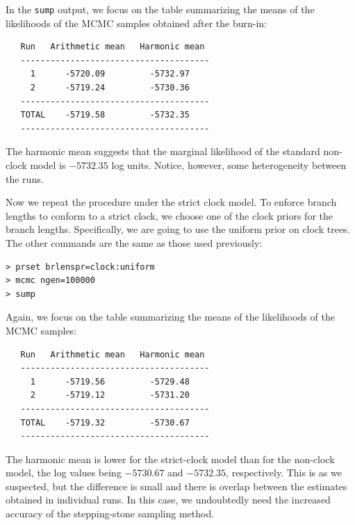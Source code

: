 \documentclass[12pt]{book}
\newcommand{\ttt}[1]{\texttt{#1}}
\begin{document}
In the \ttt{sump} output, we focus on the table summarizing the means of the likelihoods of the
MCMC samples obtained after the burn-in:

\begin{singlespacing}
\footnotesize
\begin{verbatim}
   Run   Arithmetic mean   Harmonic mean
   --------------------------------------
     1      -5720.09         -5732.97
     2      -5719.24         -5730.36
   --------------------------------------
   TOTAL    -5719.58         -5732.35
   --------------------------------------
\end{verbatim}
\end{singlespacing}
\normalsize

The harmonic mean suggests that the marginal likelihood of the standard non-clock model is
$-5732.35$ log units. Notice, however, some heterogeneity between the runs.

Now we repeat the procedure under the strict clock model. To enforce branch lengths to conform to a
strict clock, we choose one of the clock priors for the branch lengths. Specifically, we are going
to use the uniform prior on clock trees. The other commands are the same as those used previously:

\begin{singlespacing}
\small
\begin{verbatim}
> prset brlenspr=clock:uniform
> mcmc ngen=100000
> sump
\end{verbatim}
\end{singlespacing}
\normalsize

Again, we focus on the table summarizing the means of the likelihoods of the MCMC samples:

\begin{singlespacing}
\footnotesize
\begin{verbatim}
   Run   Arithmetic mean   Harmonic mean
   --------------------------------------
     1      -5719.56         -5729.48
     2      -5719.12         -5731.20
   --------------------------------------
   TOTAL    -5719.32         -5730.67
   --------------------------------------
\end{verbatim}
\end{singlespacing}
\normalsize

The harmonic mean is lower for the strict-clock model than for the non-clock model, the log values
being $-5730.67$ and $-5732.35$, respectively. This is as we suspected, but the difference is small
and there is overlap between the estimates obtained in individual runs. In this case, we
undoubtedly need the increased accuracy of the stepping-stone sampling method.
\end{document}
